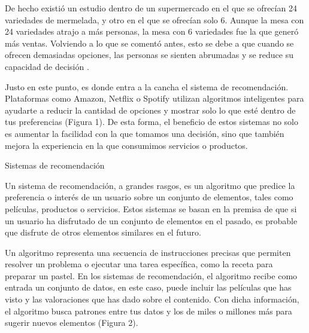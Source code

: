 \documentclass[letterpaper,10pt,final,hyphenatedtitles]{papertexKS}
\begin{document}
\begin{news}{2}
	De hecho existió un estudio dentro de un supermercado en el que se ofrecían 24 variedades de mermelada, y otro en el que se ofrecían solo 6. Aunque la mesa con 24 variedades atrajo a más personas, la mesa con 6 variedades fue la que generó más ventas. Volviendo a lo que se comentó antes, esto se debe a que cuando se ofrecen demasiadas opciones, las personas se sienten abrumadas y se reduce su capacidad de decisión \cite{iyengar2011arte}.

	Justo en este punto, es donde entra a la cancha el sistema de recomendación. Plataformas como Amazon, Netflix o Spotify utilizan algoritmos inteligentes para ayudarte a reducir la cantidad de opciones y mostrar solo lo que esté dentro de tus preferencias (Figura 1). De esta forma, el beneficio de estos sistemas no solo es aumentar la facilidad con la que tomamos una decisión, sino que también mejora la experiencia en la que consumimos servicios o productos.
	
	\begin{center}
	\end{center}
	
	\noindent\textcolor{color}{\Large{Sistemas de recomendación}}

	Un sistema de recomendación, a grandes rasgos, es un algoritmo que predice la preferencia o interés de un usuario sobre un conjunto de elementos, tales como películas, productos o servicios. Estos sistemas se basan en la premisa de que si un usuario ha disfrutado de un conjunto de elementos en el pasado, es probable que disfrute de otros elementos similares en el futuro.

	Un algoritmo representa una secuencia de instrucciones precisas que permiten resolver un problema o ejecutar una tarea específica, como la receta para preparar un pastel. En los sistemas de recomendación, el algoritmo recibe como entrada un conjunto de datos, en este caso, puede incluir las películas que has visto y las valoraciones que has dado sobre el contenido. Con dicha información, el algoritmo busca patrones entre tus datos y los de miles o millones más para sugerir nuevos elementos (Figura 2).

	\begin{center}
	\end{center}


\end{news}
\end{document}

